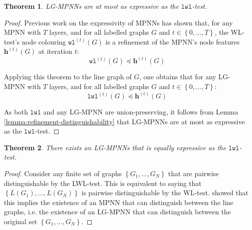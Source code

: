 \documentclass{article}
\newtheorem{theorem}{Theorem}
\newcommand{\set}[1]{\left\{#1\right\}}
\newcommand{\iter}[1]{^{(#1)}}
\newcommand{\wl}{\texttt{wl}}
\newcommand{\lwl}{\texttt{lwl}}
\newcommand{\bs}[1]{\boldsymbol{#1}}
\newcommand{\feat}{\bs{h}}
\begin{document}
\begin{theorem} \label{thm:lg-mpnn-less-than-lwl}
    LG-MPNNs are at most as expressive as the $\lwl$-test. 
\end{theorem}
\begin{proof}
    Previous work on the expressivity of MPNNs \cite{morris2019weisfeiler} has shown that, for any MPNN with $T$ layers, and for all labelled graphs $G$ and $t\in\set{0,\dots,T}$, the WL-test's node colouring $\wl\iter{t}(G)$ is a refinement of the MPNN's node features $\feat\iter{t}(G)$ at iteration $t$:
    \begin{equation}
        \wl\iter{t}(G) \preceq \feat\iter{t}(G)
    \end{equation}

    Applying this theorem to the line graph of $G$, one obtains that for any LG-MPNN with $T$ layers, and for all labelled graphs $G$ and $t\in\set{0,\dots,T}$:
    \begin{equation}    \label{eq:lwl-refinement-of-lg-mpnn}
        \lwl\iter{t}(G) \preceq \feat\iter{t}(G)
    \end{equation}

    As both $\lwl$ and any LG-MPNN are union-preserving, it follows from Lemma \ref{lemma:refinement-distinguishability} that LG-MPNNs are at most as expressive as the $\lwl$-test.
\end{proof}

\begin{theorem} \label{thm:lg-mpnn-equal-to-lwl}
    There exists an LG-MPNNs that is equally expressive as the $\lwl$-test.
\end{theorem}
\begin{proof}
    Consider any finite set of graphs $\set{G_1, \dots, G_N}$ that are pairwise distinguishable by the LWL-test. This is equivalent to saying that $\set{L(G_1), \dots, L(G_N)}$ is pairwise distinguishable by the WL-test. \cite{xu2018powerful} showed that this implies the existence of an MPNN that can distinguish between the line graphs, i.e. the existence of an LG-MPNN that can distinguish between the original set $\set{G_1, \dots, G_N}$.
\end{proof}
\end{document}
